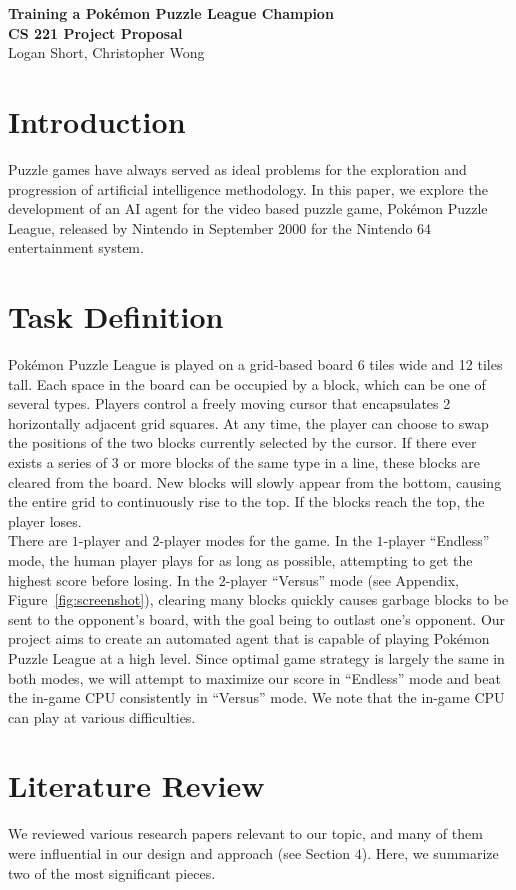\documentclass[10pt, final]{article}
\newcommand{\br}[1][.75]{\ \\[#1\baselineskip]}
\begin{document}
\begin{center}
\LARGE{\textbf{Training a Pok\'{e}mon Puzzle League Champion}}\\
\Large{\textbf{CS 221 Project Proposal}}\\
\Large{Logan Short, Christopher Wong}
\end{center}

\section{Introduction}
Puzzle games have always served as ideal problems for the exploration and progression of artificial intelligence methodology. In this paper, we explore the development of an AI agent for the video based puzzle game, Pok\'{e}mon Puzzle League, released by Nintendo in September 2000 for the Nintendo 64 entertainment system.

\section{Task Definition}
Pok\'{e}mon Puzzle League is played on a grid-based board 6 tiles wide and 12 tiles tall. Each space in the board can be occupied by a block, which can be one of several types. Players control a freely moving cursor that encapsulates 2 horizontally adjacent grid squares. At any time, the player can choose to swap the positions of the two blocks currently selected by the cursor. If there ever exists a series of $3$ or more blocks of the same type in a line, these blocks are cleared from the board. New blocks will slowly appear from the bottom, causing the entire grid to continuously rise to the top. If the blocks reach the top, the player loses.\br
There are $1$-player and $2$-player modes for the game. In the $1$-player ``Endless'' mode, the human player plays for as long as possible, attempting to get the highest score before losing. In the $2$-player ``Versus'' mode (see Appendix, Figure~\ref{fig:screenshot}), clearing many blocks quickly causes garbage blocks to be sent to the opponent's board, with the goal being to outlast one's opponent. Our project aims to create an automated agent that is capable of playing Pok\'{e}mon Puzzle League at a high level. Since optimal game strategy is largely the same in both modes, we will attempt to maximize our score in ``Endless'' mode and beat the in-game CPU consistently in ``Versus'' mode. We note that the in-game CPU can play at various difficulties.

\section{Literature Review}
We reviewed various research papers relevant to our topic, and many of them were influential in our design and approach (see Section $4$). Here, we summarize two of the most significant pieces.
\end{document}
